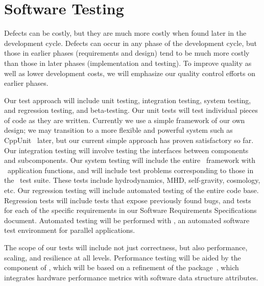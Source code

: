 \documentclass[10pt,twocolumn]{article}
\begin{document}
\section{Software Testing} \label{s:testing}


Defects can be costly, but they are much more costly when found later
in the development cycle.  Defects can occur in any phase of the
development cycle, but those in earlier phases (requirements and
design) tend to be much more costly than those in later phases
(implementation and testing).  To improve quality as well as lower
development costs, we will emphasize our quality control efforts on
earlier phases.

Our test approach will include unit testing, integration testing,
system testing, and regression testing, and beta-testing.  Our unit
tests will test individual pieces of code as they are written.
Currently we use a simple framework of our own design; we may
transition to a more flexible and powerful system such as
CppUnit~\cite{wwwcppunit} later, but our current simple approach has
proven satisfactory so far.  Our integration testing will involve
testing the interfaces between components and subcomponents.  Our
system testing will include the entire \cello\ framework with \enzoii\
application functions, and will include test problems corresponding to
those in the \enzo\ test suite.  These tests include hydrodynamics,
MHD, self-gravity, cosmology, etc.  Our regression testing will
include automated testing of the entire code base.  Regression tests
will include tests that expose previously found bugs, and tests for
each of the specific requirements in our Software Requirements
Specifications document.  Automated testing will be performed with
\lcatest, an automated software test environment for parallel
applications.  

The scope of our tests will include not just correctness, but also
performance, scaling, and resilience at all levels.  Performance
testing will be aided by the \code{Performance} component of \cello,
which will be based on a refinement of the \code{lcaperf}
package~\cite{wwwlcaperf}, which integrates hardware performance
metrics with software data structure attributes.
\end{document}
